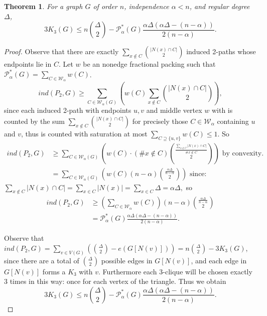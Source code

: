 \documentclass[12pt]{article}
\newtheorem{theorem}{Theorem}
\begin{document}
\begin{theorem}
\label{thm: K_3 UB by packing}
    For a graph $G$ of order $n$, independence $\alpha<n$, and regular degree $\Delta$, 
\[
3K_3(G)\leq n\binom{\Delta}{2}-\mathcal{P}_\alpha^*(G)\frac{\alpha\Delta(\alpha\Delta-(n-\alpha))}{2(n-\alpha)}.
\]
\end{theorem}
\begin{proof}
     Observe that there are exactly $\sum_{x\not\in C}\binom{|N(x)\cap C|}{2}$ induced 2-paths whose endpoints lie in $C$.
    Let $w$ be an nonedge fractional packing such that $\mathcal{P}_\alpha^*(G)=\sum_{C\in\mathcal{W}_\alpha}w(C)$.
    $$ind(P_2,G)\geq\sum_{C\in\mathcal{W}_\alpha(G)}\left(w(C)\sum_{x\not\in C}\binom{|N(x)\cap C|}{2}\right),$$
    since each induced 2-path with endpoints $u,v$ and middle vertex $w$ with is counted by the sum $\sum_{x\not\in C}\binom{|N(x)\cap C|}{2}$ for precisely those $C\in\mathcal{W}_\alpha$ containing $u$ and $v$, thus is counted with saturation at most $\sum_{C\supseteq\{u,v\}}w(C)\leq1$. So \begin{align*}
        ind(P_2,G)
        &\geq \sum_{C\in\mathcal{W}_\alpha(G)}\left(w(C)\cdot(\#x\not\in C)\binom{\frac{\sum_{x\not\in C}|N(x)\cap C|}{\#x\not\in C}}{2}\right)\text{ by convexity.}\\
        &=\sum_{C\in\mathcal{W}_\alpha(G)}\left(w(C)(n-\alpha)\binom{\frac{\alpha\Delta}{n-\alpha}}{2}\right)\text{ since:}
    \end{align*}
    $\sum_{x\not\in C}|N(x)\cap C|=\sum_{x\in C}|N(x)|=\sum_{x\in C}\Delta=\alpha\Delta,$ so \begin{align*}
        ind(P_2,G)&\geq\left(\sum_{C\in\mathcal{W}_\alpha}w(C)\right)(n-\alpha)\binom{\frac{\alpha\Delta}{n-\alpha}}{2}\\
        &=\mathcal{P}_\alpha^*(G)\frac{\alpha\Delta(\alpha\Delta-(n-\alpha))}{2(n-\alpha)}.
    \end{align*}

Observe that $ind(P_2,G)=\sum_{v\in V(G)}\left(\binom{\Delta}{2}-e(G[N(v)])\right)=n\binom{\Delta}{2}-3K_3(G)$, since there are a total of $\binom{\Delta}{2}$ possible edges in $G[N(v)]$, and each edge in $G[N(v)]$ forms a $K_3$ with $v$. Furthermore each 3-clique will be chosen exactly 3 times in this way: once for each vertex of the triangle. Thus we obtain
\[
3K_3(G)\leq n\binom{\Delta}{2}-\mathcal{P}_\alpha^*(G)\frac{\alpha\Delta(\alpha\Delta-(n-\alpha))}{2(n-\alpha)}.
\]

\end{proof}
\end{document}
